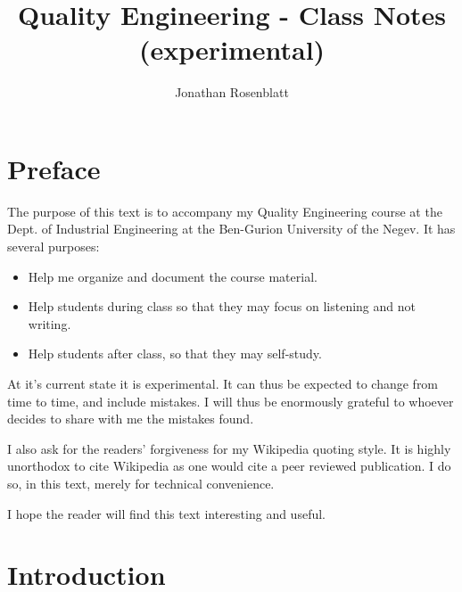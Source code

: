 \documentclass[12pt,a4paper]{report}
\author{Jonathan Rosenblatt}
\title{Quality Engineering - Class Notes (experimental)}
\begin{document}
\maketitle




\chapter*{Preface}
The purpose of this text is to accompany my Quality Engineering course at the Dept. of Industrial Engineering at the Ben-Gurion University of the Negev.
It has several purposes:
\begin{itemize}
\item Help me organize and document the course material.
\item Help students during class so that they may focus on listening and not writing.
\item Help students after class, so that they may self-study.
\end{itemize}

At it's current state it is experimental. It can thus be expected to change from time to time, and include mistakes.
I will thus be enormously grateful to whoever decides to share with me the mistakes found.

I also ask for the readers' forgiveness for my Wikipedia quoting style. 
It is highly unorthodox to cite Wikipedia as one would cite a peer reviewed publication. 
I do so, in this text, merely for technical convenience. 

I hope the reader will find this text interesting and useful. 




\tableofcontents


\listoffigures

\renewcommand{\listtheoremname}{List of Definitions}
\listoftheorems[ignoreall,show={definition}]




\chapter{Introduction}
\end{document}
